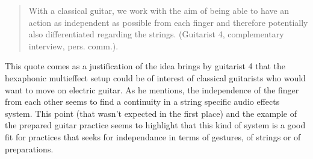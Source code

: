 \documentclass{article}
\begin{document}
\begin{quote}
With a classical guitar, we work with the aim of being able to have an action as independent as possible from each finger and therefore potentially also differentiated regarding the strings. (Guitarist 4, complementary interview, pers. comm.).
\end{quote}

This quote comes as a justification of the idea brings by guitarist 4 that the hexaphonic multieffect setup could be of interest of classical guitarists who would want to move on electric guitar. As he mentions, the independence of the finger from each other seems to find a continuity in a string specific audio effects system. This point (that wasn't expected in the first place) and the example of the prepared guitar practice seems to highlight that this kind of system is a good fit for practices that seeks for independance in terms of gestures, of strings or of preparations.

%


\end{document}
